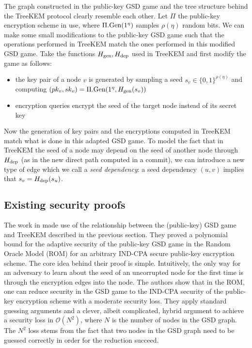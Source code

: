 The graph constructed in the public-key GSD game and the tree structure behind the TreeKEM protocol clearly resemble each other. Let $\Pi$ the public-key encryption scheme in use, where $\Pi.\mathrm{Gen}(1^\eta)$ samples $\rho(\eta)$ random bits. We can make some small modifications to the public-key GSD game such that the operations performed in TreeKEM match the ones performed in this modified GSD game. Take the functions $H_\mathrm{gen}, H_\mathrm{dep}$ used in TreeKEM and first modify the game as follows:
\begin{itemize}
	\item the key pair of a node $v$ is generated by sampling a seed $s_v \in \{0, 1\}^{\rho(\eta)}$ and computing $(pk_v, sk_v) = \Pi.\mathrm{Gen}(1^\eta, H_\mathrm{gen}(s_v))$
	\item encryption queries encrypt the seed of the target node instead of its secret key
\end{itemize}
Now the generation of key pairs and the encryptions computed in TreeKEM match what is done in this adapted GSD game. To model the fact that in TreeKEM the seed of a node may depend on the seed of another node through $H_\mathrm{dep}$ (as in the new direct path computed in a commit), we can introduce a new type of edge which we call a \emph{seed dependency}: a seed dependency $(u, v)$ implies that $s_v = H_\mathrm{dep}(s_u)$.

\subsection{Existing security proofs}

The work in \cite{ttkem} made use of the relationship between the (public-key) GSD game and TreeKEM described in the previous section. They proved a polynomial bound for the adaptive security of the public-key GSD game in the Random Oracle Model (ROM) \cite{rom} for an arbitrary IND-CPA secure public-key encryption scheme. The core idea behind their proof is simple. Intuitively, the only way for an adversary to learn about the seed of an uncorrupted node for the first time is through the encryption edges into the node. The authors show that in the ROM, one can reduce security in the GSD game to the IND-CPA security of the public-key encryption scheme with a moderate security loss. They apply standard guessing arguments and a clever, albeit complicated, hybrid argument to achieve a security loss in $\mathcal{O}(N^2)$, where $N$ is the number of nodes in the GSD graph. The $N^2$ loss stems from the fact that two nodes in the GSD graph need to be guessed correctly in order for the reduction succeed.

